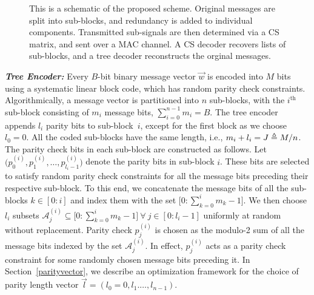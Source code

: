 \documentclass{article}
\begin{document}
\begin{figure}[!ht]
\centering
\resizebox{\columnwidth}{!}{}
\caption{This is a schematic of the proposed scheme.
Original messages are split into sub-blocks, and redundancy is added to individual components.
Transmitted sub-signals are then determined via a CS matrix, and sent over a MAC channel.
A CS decoder recovers lists of sub-blocks, and a tree decoder reconstructs the orginal messages.}
\label{fig:1}
\end{figure}


\textbf{\textit{Tree Encoder:}}
Every $B$-bit binary message vector $\vec{\mathit{w}}$ is encoded into $M$ bits using a systematic linear block code, which has random parity check constraints.  Algorithmically, a message vector is partitioned into $n$ sub-blocks, with the $i^{\text{th}}$ sub-block consisting of $m_i$ message bits, $\sum_{i=0}^{n-1}m_i=B$.
The tree encoder appends $l_i$ parity bits to sub-block~$i$, except for the first block as we choose $l_0 = 0$.
All the coded sub-blocks have the same length, i.e., $m_i+l_i =J\triangleq  {M}/{n}$. %
The parity check bits in each sub-block are constructed as follows.
Let $\big( p^{(i)}_{0},p^{(i)}_{1},\dots,p^{(i)}_{l_{i}-1} \big)$ denote the parity bits in sub-block $i$.
These bits are selected to satisfy random parity check constraints for all the message bits preceding their respective sub-block.
To this end, we concatenate the message bits of all the sub-blocks $k \in [0:i]$ and index them with the set $\big[ 0:\sum_{k=0}^{i}m_k-1 \big]$. We then choose $l_{i}$ subsets $\mathcal{A}^{(i)}_j \subseteq \big[ 0:\sum_{k=0}^{i}m_k-1 \big]~\forall ~j \in [0:l_i-1]$ uniformly at random without replacement.
Parity check $p^{(i)}_j$ is chosen as the modulo-2 sum of all the message bits indexed by the set $\mathcal{A}^{(i)}_j$.
In effect, $p^{(i)}_j$ acts as a parity check constraint for some randomly chosen message bits preceding it.
In Section~\ref{parityvector}, we describe an optimization framework for the choice of parity length vector $\vec{l}=(l_0=0,l_1.\dots,l_{n-1})$.
\end{document}

